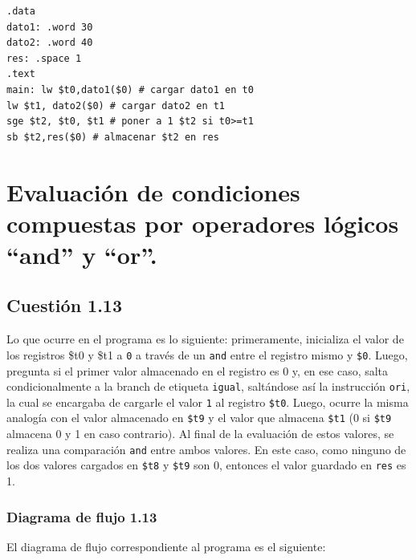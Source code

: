 \documentclass[11pt]{article}
\begin{document}
\begin{large}
\begin{flushleft}
\begin{listing}[h]
\begin{verbatim}
.data
dato1: .word 30
dato2: .word 40
res: .space 1
.text
main: lw $t0,dato1($0) # cargar dato1 en t0
lw $t1, dato2($0) # cargar dato2 en t1
sge $t2, $t0, $t1 # poner a 1 $t2 si t0>=t1
sb $t2,res($0) # almacenar $t2 en res
\end{verbatim}
\end{listing}

\section*{Evaluación de condiciones compuestas por operadores lógicos
``and'' y ``or''.}


\subsection*{Cuestión 1.13}
Lo que ocurre en el programa es lo siguiente: primeramente, inicializa el valor de los registros \$t0 y \$t1 a \texttt{0} a través de un \texttt{and} entre el registro mismo y \texttt{\$0}. Luego, pregunta si el primer valor almacenado en el registro es 0 y, en ese caso, salta condicionalmente a la branch de etiqueta \texttt{igual}, saltándose así la instrucción \texttt{ori}, la cual se encargaba de cargarle el valor \texttt{1} al registro \texttt{\$t0}. Luego, ocurre la misma analogía con el valor almacenado en \texttt{\$t9} y el valor que almacena \texttt{\$t1} (0 si \texttt{\$t9} almacena 0 y 1 en caso contrario). Al final de la evaluación de estos valores, se realiza una comparación \texttt{and} entre ambos valores. En este caso, como ninguno de los dos valores cargados en \texttt{\$t8} y \texttt{\$t9} son 0, entonces el valor guardado en \texttt{res} es 1.

\subsubsection*{Diagrama de flujo 1.13}
El diagrama de flujo correspondiente al programa es el siguiente:


\end{flushleft}
\end{large}
\end{document}
